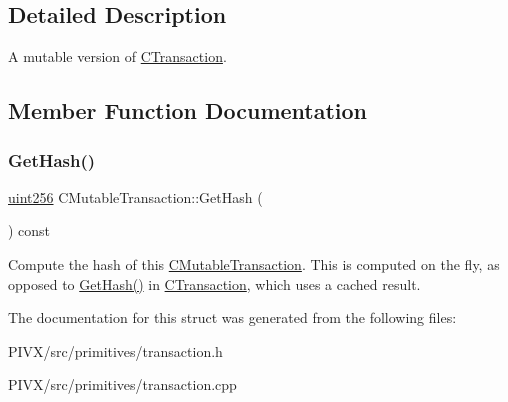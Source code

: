 \subsection{Detailed Description}
A mutable version of \mbox{\hyperlink{class_c_transaction}{C\+Transaction}}. 

\subsection{Member Function Documentation}
\mbox{\label{struct_c_mutable_transaction_a52799a4ca4831f56532c1c0bcb110721}} 
\subsubsection{\texorpdfstring{Get\+Hash()}{GetHash()}}
{\footnotesize\ttfamily \mbox{\hyperlink{classuint256}{uint256}} C\+Mutable\+Transaction\+::\+Get\+Hash (\begin{DoxyParamCaption}{ }\end{DoxyParamCaption}) const}

Compute the hash of this \mbox{\hyperlink{struct_c_mutable_transaction}{C\+Mutable\+Transaction}}. This is computed on the fly, as opposed to \mbox{\hyperlink{struct_c_mutable_transaction_a52799a4ca4831f56532c1c0bcb110721}{Get\+Hash()}} in \mbox{\hyperlink{class_c_transaction}{C\+Transaction}}, which uses a cached result. 

The documentation for this struct was generated from the following files\+:\begin{DoxyCompactItemize}
\item 
P\+I\+V\+X/src/primitives/transaction.\+h\item 
P\+I\+V\+X/src/primitives/transaction.\+cpp\end{DoxyCompactItemize}
